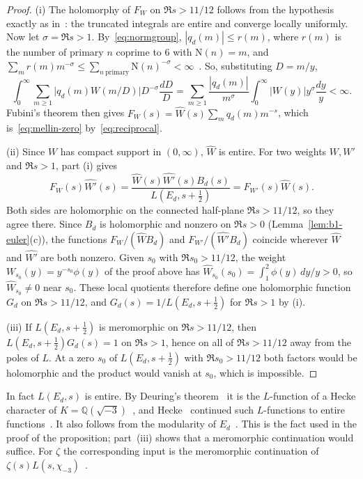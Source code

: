 \documentclass[11pt]{article}
\numberwithin{equation}{section}
\newcommand{\N}{\mathrm N}
\begin{document}
\begin{proof}
(i) The holomorphy of $F_W$ on $\Re s>11/12$ follows from the hypothesis exactly as
in~\cite[Section~3]{OAI1112}: the truncated integrals are entire and converge locally uniformly. Now let
$\sigma=\Re s>1$. By~\eqref{eq:normgroup},
$|q_d(m)|\le r(m)$, where $r(m)$ is the number of primary $n$ coprime to $6$ with $\N(n)=m$, and
$\sum_mr(m)m^{-\sigma}\le\sum_{n\ \mathrm{primary}}\N(n)^{-\sigma}<\infty$~\cite[(2.8)]{QF}. So, substituting $D=m/y$,
\begin{equation}\label{eq:d030}
 \int_0^\infty\sum_{m\ge1}\bigl|q_d(m)W(m/D)\bigr|D^{-\sigma}\frac{dD}D
 =\sum_{m\ge1}\frac{|q_d(m)|}{m^\sigma}\int_0^\infty|W(y)|y^\sigma\frac{dy}y<\infty .
\end{equation}
Fubini's theorem then gives $F_W(s)=\widehat W(s)\sum_mq_d(m)m^{-s}$, which is~\eqref{eq:mellin-zero}
by~\eqref{eq:reciprocal}.

(ii) Since $W$ has compact support in $(0,\infty)$, $\widehat W$ is entire. For two weights $W,W'$ and $\Re s>1$,
part (i) gives
\begin{equation}\label{eq:d031}
 F_W(s)\widehat{W'}(s)=\frac{\widehat W(s)\widehat{W'}(s)B_d(s)}{L(E_d,s+\frac12)}=F_{W'}(s)\widehat W(s).
\end{equation}
Both sides are holomorphic on the connected half-plane $\Re s>11/12$, so they agree there. Since $B_d$ is holomorphic
and nonzero on $\Re s>0$ (Lemma~\ref{lem:b1-euler}(c)), the functions $F_W/(\widehat WB_d)$ and
$F_{W'}/(\widehat{W'}B_d)$ coincide wherever $\widehat W$ and $\widehat{W'}$ are both nonzero. Given $s_0$ with
$\Re s_0>11/12$, the weight $W_{s_0}(y)=y^{-s_0}\phi(y)$ of the proof above has
$\widehat W_{s_0}(s_0)=\int_1^2\phi(y)\,dy/y>0$, so $\widehat W_{s_0}\ne0$ near $s_0$. These local quotients therefore
define one holomorphic function $G_d$ on $\Re s>11/12$, and $G_d(s)=1/L(E_d,s+\frac12)$ for $\Re s>1$ by (i).

(iii) If $L(E_d,s+\frac12)$ is meromorphic on $\Re s>11/12$, then $L(E_d,s+\frac12)G_d(s)=1$ on $\Re s>1$, hence on all
of $\Re s>11/12$ away from the poles of $L$. At a zero $s_0$ of $L(E_d,s+\frac12)$ with $\Re s_0>11/12$ both factors
would be holomorphic and the product would vanish at $s_0$, which is impossible.
\end{proof}

In fact $L(E_d,s)$ is entire. By Deuring's theorem~\cite{Deuring} it is the $L$-function of a Hecke character of
$K=\mathbb Q(\sqrt{-3})$~\cite[Chapter~II, \S10]{SilATAEC}, and Hecke~\cite{Hec20} continued such $L$-functions to entire
functions~\cite[Chapter~VII, \S8]{Neukirch}. It also follows from the modularity of $E_d$~\cite{Shimura71}. This is the fact used in
the proof of the proposition; part~(iii) shows that a meromorphic continuation would suffice. For $\zeta$ the
corresponding input is the meromorphic continuation of $\zeta(s)L(s,\chi_{-3})$~\cite[Section~5]{ZG}.
\end{document}
